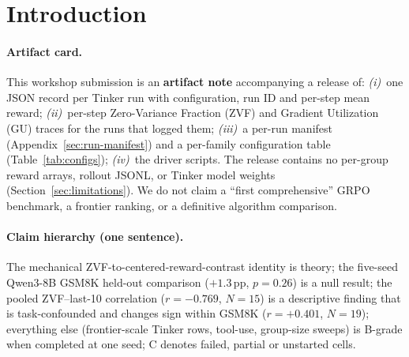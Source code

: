 \section{Introduction}
\label{sec:intro}

\paragraph{Artifact card.}
This workshop submission is an \textbf{artifact note} accompanying a release
of: \textit{(i)}~one JSON record per Tinker run with configuration, run ID and
per-step mean reward; \textit{(ii)}~per-step Zero-Variance Fraction (ZVF) and
Gradient Utilization (GU) traces for the runs that logged them;
\textit{(iii)}~a per-run manifest (Appendix~\ref{sec:run-manifest}) and a
per-family configuration table (Table~\ref{tab:configs});
\textit{(iv)}~the driver scripts. The release contains no per-group reward
arrays, rollout JSONL, or Tinker model weights (Section~\ref{sec:limitations}). We do
not claim a ``first comprehensive'' GRPO benchmark, a frontier ranking, or a
definitive algorithm comparison.

\paragraph{Claim hierarchy (one sentence).}
The mechanical ZVF-to-centered-reward-contrast identity is theory; the
five-seed Qwen3-8B GSM8K held-out comparison ($+1.3$\,pp, $p{=}0.26$) is a
null result; the pooled ZVF--last-10 correlation ($r{=}{-}0.769$, $N{=}15$)
is a descriptive finding that is task-confounded and changes sign within
GSM8K ($r{=}{+}0.401$, $N{=}19$); everything else (frontier-scale Tinker rows,
tool-use, group-size sweeps) is B-grade when completed at one seed; C denotes
failed, partial or unstarted cells.

